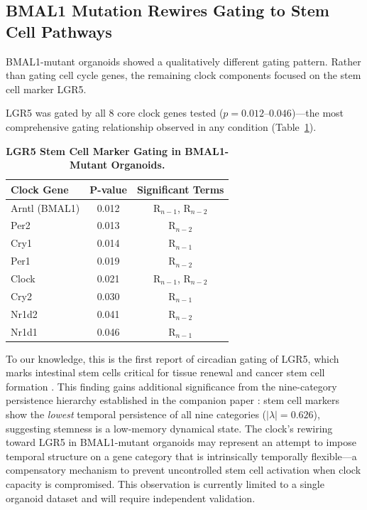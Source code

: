 \documentclass[11pt,letterpaper]{article}
\begin{document}
\subsection{BMAL1 Mutation Rewires Gating to Stem Cell Pathways}

BMAL1-mutant organoids showed a qualitatively different gating pattern. Rather than gating cell cycle genes, the remaining clock components focused on the stem cell marker LGR5.

LGR5 was gated by all 8 core clock genes tested ($p = 0.012$--$0.046$)---the most comprehensive gating relationship observed in any condition (Table~\ref{tab:lgr5}).

\begin{table}[H]
\centering
\caption{\textbf{LGR5 Stem Cell Marker Gating in BMAL1-Mutant Organoids.}}
\label{tab:lgr5}
\begin{tabular}{lcc}
\toprule
\textbf{Clock Gene} & \textbf{P-value} & \textbf{Significant Terms} \\
\midrule
Arntl (BMAL1) & 0.012 & R$_{n-1}$, R$_{n-2}$ \\
Per2 & 0.013 & R$_{n-2}$ \\
Cry1 & 0.014 & R$_{n-1}$ \\
Per1 & 0.019 & R$_{n-2}$ \\
Clock & 0.021 & R$_{n-1}$, R$_{n-2}$ \\
Cry2 & 0.030 & R$_{n-1}$ \\
Nr1d2 & 0.041 & R$_{n-2}$ \\
Nr1d1 & 0.046 & R$_{n-1}$ \\
\bottomrule
\end{tabular}
\end{table}

To our knowledge, this is the first report of circadian gating of LGR5, which marks intestinal stem cells critical for tissue renewal and cancer stem cell formation \citep{barker2007}. This finding gains additional significance from the nine-category persistence hierarchy established in the companion paper \citep{whiteside2026paper1}: stem cell markers show the \textit{lowest} temporal persistence of all nine categories ($|\lambda| = 0.626$), suggesting stemness is a low-memory dynamical state. The clock's rewiring toward LGR5 in BMAL1-mutant organoids may represent an attempt to impose temporal structure on a gene category that is intrinsically temporally flexible---a compensatory mechanism to prevent uncontrolled stem cell activation when clock capacity is compromised. This observation is currently limited to a single organoid dataset and will require independent validation.
\end{document}
